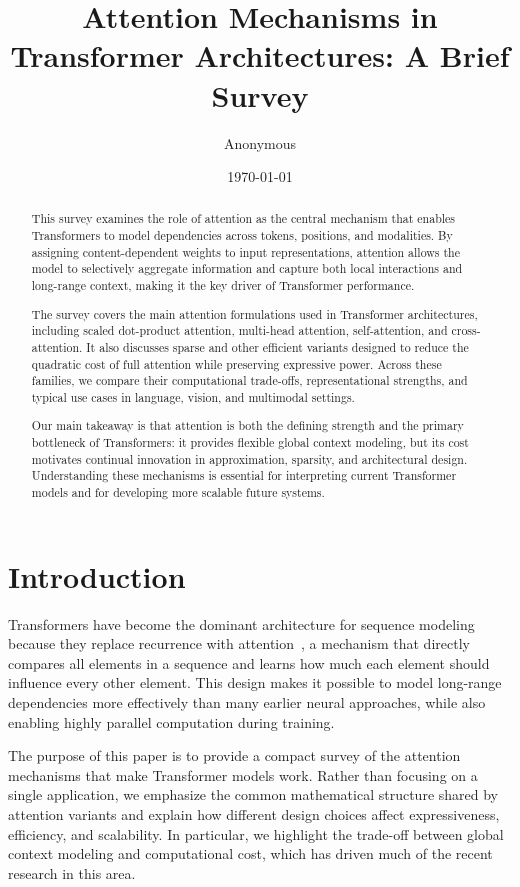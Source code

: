 \documentclass[a4paper,11pt]{article}
\title{Attention Mechanisms in Transformer Architectures: A Brief Survey}
\author{Anonymous}
\date{\today}
\begin{document}
\maketitle

\begin{abstract}
  This survey examines the role of attention as the central mechanism that enables Transformers to model dependencies across tokens, positions, and modalities. By assigning content-dependent weights to input representations, attention allows the model to selectively aggregate information and capture both local interactions and long-range context, making it the key driver of Transformer performance.

  The survey covers the main attention formulations used in Transformer architectures, including scaled dot-product attention, multi-head attention, self-attention, and cross-attention. It also discusses sparse and other efficient variants designed to reduce the quadratic cost of full attention while preserving expressive power. Across these families, we compare their computational trade-offs, representational strengths, and typical use cases in language, vision, and multimodal settings.

  Our main takeaway is that attention is both the defining strength and the primary bottleneck of Transformers: it provides flexible global context modeling, but its cost motivates continual innovation in approximation, sparsity, and architectural design. Understanding these mechanisms is essential for interpreting current Transformer models and for developing more scalable future systems.
\end{abstract}

\section{Introduction}

Transformers have become the dominant architecture for sequence modeling because they replace recurrence with attention~\cite{vaswani2017attention}, a mechanism that directly compares all elements in a sequence and learns how much each element should influence every other element. This design makes it possible to model long-range dependencies more effectively than many earlier neural approaches, while also enabling highly parallel computation during training.

The purpose of this paper is to provide a compact survey of the attention mechanisms that make Transformer models work. Rather than focusing on a single application, we emphasize the common mathematical structure shared by attention variants and explain how different design choices affect expressiveness, efficiency, and scalability. In particular, we highlight the trade-off between global context modeling and computational cost, which has driven much of the recent research in this area.
\end{document}
